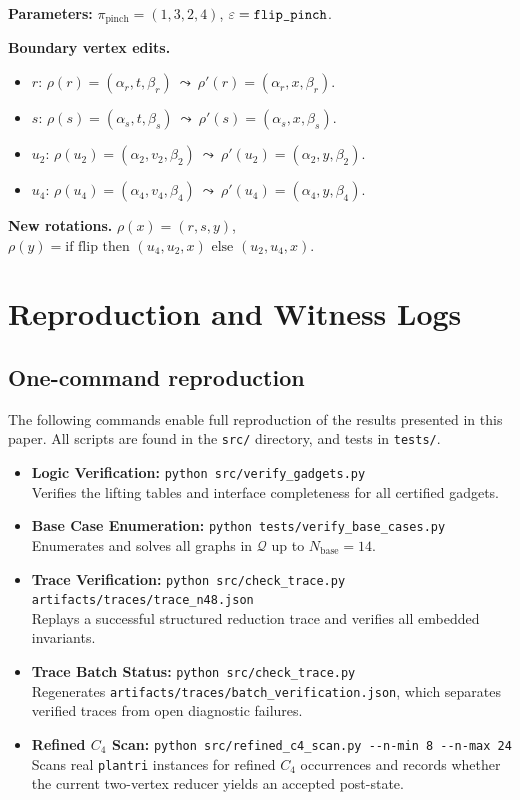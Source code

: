 \documentclass[12pt]{article}
\theoremstyle{definition}
\begin{document}
\noindent\textbf{Parameters:} $\pi_{\mathrm{pinch}} = (1, 3, 2, 4)$, $\varepsilon = \verb|flip_pinch|$.

\medskip
\noindent\textbf{Boundary vertex edits.}
\begin{itemize}
  \item $r$: $\rho(r)=(\alpha_r, t, \beta_r)\ \leadsto\ \rho'(r)=(\alpha_r, x, \beta_r)$.
  \item $s$: $\rho(s)=(\alpha_s, t, \beta_s)\ \leadsto\ \rho'(s)=(\alpha_s, x, \beta_s)$.
  \item $u_2$: $\rho(u_2)=(\alpha_2, v_2, \beta_2)\ \leadsto\ \rho'(u_2)=(\alpha_2, y, \beta_2)$.
  \item $u_4$: $\rho(u_4)=(\alpha_4, v_4, \beta_4)\ \leadsto\ \rho'(u_4)=(\alpha_4, y, \beta_4)$.
\end{itemize}

\medskip
\noindent\textbf{New rotations.} 
$\rho(x)=(r,s,y)$, $\rho(y)=\text{if flip then } (u_4,u_2,x) \text{ else } (u_2,u_4,x)$.


\section{Reproduction and Witness Logs}
\label{app:reproduction}

\subsection{One-command reproduction}

The following commands enable full reproduction of the results presented in this paper. All scripts are found in the \texttt{src/} directory, and tests in \texttt{tests/}.

\begin{itemize}
    \item \textbf{Logic Verification:} \verb|python src/verify_gadgets.py| \\
    Verifies the lifting tables and interface completeness for all certified gadgets.
    \item \textbf{Base Case Enumeration:} \verb|python tests/verify_base_cases.py| \\
    Enumerates and solves all graphs in $\mathcal{Q}$ up to $N_{\mathrm{base}}=14$.
    \item \textbf{Trace Verification:} \verb|python src/check_trace.py artifacts/traces/trace_n48.json| \\
    Replays a successful structured reduction trace and verifies all embedded invariants.
    \item \textbf{Trace Batch Status:} \verb|python src/check_trace.py| \\
    Regenerates \verb|artifacts/traces/batch_verification.json|, which separates verified traces from open diagnostic failures.
    \item \textbf{Refined $C_4$ Scan:} \verb|python src/refined_c4_scan.py --n-min 8 --n-max 24| \\
    Scans real \verb|plantri| instances for refined $C_4$ occurrences and records whether the current two-vertex reducer yields an accepted post-state.
\end{itemize}
\end{document}
